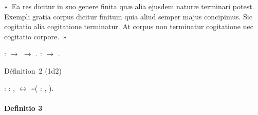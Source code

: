 \documentclass[12pt]{report}
\begin{document}
 « Ea res dicitur in suo genere finita quæ alia ejusdem naturæ
  terminari potest. Exempli gratia corpus dicitur finitum quia aliud
  semper majus concipimus. Sic cogitatio alia cogitatione terminatur. At
  corpus non terminatur cogitatione nec cogitatio corpore. » \begin{coqdoccode}
\coqdocemptyline
\coqdocindent{1.00em}
 :  \ensuremath{\rightarrow}  \ensuremath{\rightarrow} .\coqdoceol
\coqdocindent{1.00em}
 :  \ensuremath{\rightarrow} .\coqdoceol
\coqdocemptyline
\end{coqdoccode}
Définition 2 (1d2) \begin{coqdoccode}
\coqdocindent{1.00em}
 : \coqdoceol
\coqdocindent{2.00em}
\coqdockw{\ensuremath{\forall}} : , \coqdoceol
\coqdocindent{3.00em}
  \coqdoceol
\coqdocindent{3.00em}
\ensuremath{\leftrightarrow} \coqdoceol
\coqdocindent{3.00em}
\~{}(\coqdoctac{\ensuremath{\exists}} : ,   ).\coqdoceol
\coqdocemptyline
\end{coqdoccode}
\paragraph{Definitio 3}
\end{document}
